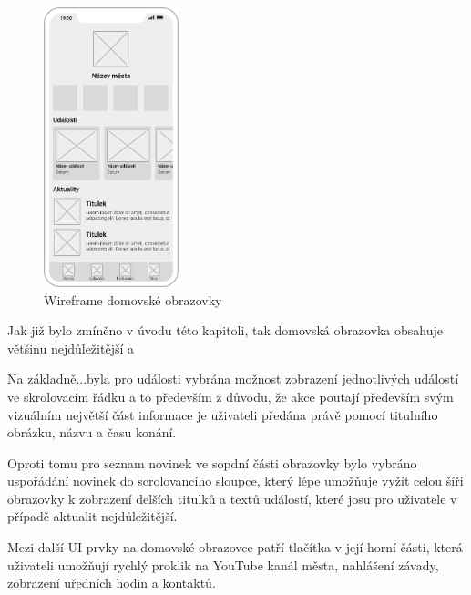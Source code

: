 \begin{figure}
  \centering
  \includegraphics[width=0.35\textwidth]{home_wireframe.png}
  \caption{Wireframe domovské obrazovky}
\end{figure}

Jak již bylo zmíněno v úvodu této kapitoli, tak domovská obrazovka obsahuje většinu nejdůležitější a 

Na základně...byla pro události vybrána možnost zobrazení jednotlivých událostí ve skrolovacím řádku a to především z důvodu,
 že akce poutají především svým vizuálním největší část informace je uživateli předána právě pomocí titulního obrázku, názvu
a času konání.

Oproti tomu pro seznam novinek ve sopdní části obrazovky bylo vybráno uspořádání novinek do scrolovancího sloupce, který lépe umožňuje 
vyžít celou šíři obrazovky k zobrazení delších titulků a textů událostí, které josu pro uživatele v případě aktualit nejdůležitější.

Mezi další UI prvky na domovské obrazovce patří tlačítka v její horní části, která uživateli umožňují rychlý proklik na YouTube kanál města,
nahlášení závady, zobrazení uředních hodin a kontaktů.




